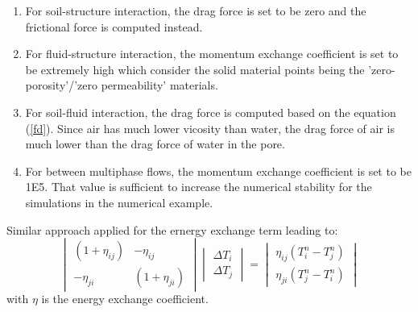 \documentclass[preprint,12pt]{elsarticle}
\begin{document}
\begin{enumerate}
\item For soil-structure interaction, the drag force is set to be zero and the frictional force is computed instead.
\item For fluid-structure interaction, the momentum exchange coefficient is set to be extremely high which consider the solid material points being the 'zero-porosity'/'zero permeability' materials.
\item For soil-fluid interaction, the drag force is computed based on the equation (\ref{fd}). Since air has much lower vicosity than water, the drag force of air is much lower than the drag force of water in the pore.
\item For between multiphase flows, the momentum exchange coefficient is set to be 1E5. That value is sufficient to increase the numerical stability for the simulations in the numerical example.
\end {enumerate}
Similar approach applied for the ernergy exchange term leading to:
%
%
\[ \begin{vmatrix} (1 + \eta_{ij})  &  -\eta_{ij} \\
                  -\eta_{ji}       &  (1 + \eta_{ji})
    \end {vmatrix}
    \begin{vmatrix} \Delta T_{i} \\
                    \Delta T_{j}
    \end {vmatrix}
    =
    \begin{vmatrix}  \eta_{ij}(T_{i}^{n} - T_{j}^{n}) \\
                    \eta_{ji}(T_{j}^{n} - T_i^{n})
    \end {vmatrix}                
\]
with $\eta$ is the energy exchange coefficient.\\
\end{document}
